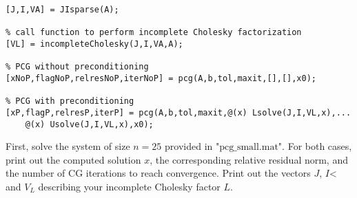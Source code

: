 \documentclass[12pt]{article}
\begin{document}
\begin{itemize}
\begin{lstlisting}[caption= Compute \text{$Ax=b$} Using PCG With and Without Preconditioning]
% call function to generate J, I, and VA
[J,I,VA] = JIsparse(A);

% call function to perform incomplete Cholesky factorization
[VL] = incompleteCholesky(J,I,VA,A);

% PCG without preconditioning
[xNoP,flagNoP,relresNoP,iterNoP] = pcg(A,b,tol,maxit,[],[],x0);

% PCG with preconditioning
[xP,flagP,relresP,iterP] = pcg(A,b,tol,maxit,@(x) Lsolve(J,I,VL,x),...
    @(x) Usolve(J,I,VL,x),x0);
\end{lstlisting}

First, solve the system of size $n=25$ provided in $\text{"pcg\_small.mat"}$.  For both cases, print out the computed solution $x$, the corresponding relative residual norm, and the number of CG iterations to reach convergence.  Print out the vectors $J$, $I$< and $V_L$ describing your incomplete Cholesky factor $L$.\\


\end{itemize}
\end{document}
